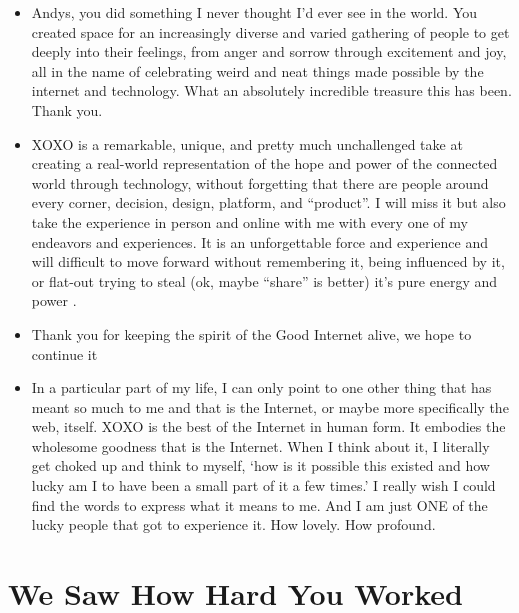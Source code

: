 \documentclass[
]{book}
\providecommand{\tightlist}{%
  \setlength{\itemsep}{0pt}\setlength{\parskip}{0pt}}
\begin{document}
\begin{itemize}
\tightlist
\item
  Andys, you did something I never thought I'd ever see in the world. You created space for an increasingly diverse and varied gathering of people to get deeply into their feelings, from anger and sorrow through excitement and joy, all in the name of celebrating weird and neat things made possible by the internet and technology. What an absolutely incredible treasure this has been. Thank you.
\item
  XOXO is a remarkable, unique, and pretty much unchallenged take at creating a real-world representation of the hope and power of the connected world through technology, without forgetting that there are people around every corner, decision, design, platform, and ``product''. I will miss it but also take the experience in person and online with me with every one of my endeavors and experiences. It is an unforgettable force and experience and will difficult to move forward without remembering it, being influenced by it, or flat-out trying to steal (ok, maybe ``share'' is better) it's pure energy and power .
\item
  Thank you for keeping the spirit of the Good Internet alive, we hope to continue it
\item
  In a particular part of my life, I can only point to one other thing that has meant so much to me and that is the Internet, or maybe more specifically the web, itself. XOXO is the best of the Internet in human form. It embodies the wholesome goodness that is the Internet. When I think about it, I literally get choked up and think to myself, `how is it possible this existed and how lucky am I to have been a small part of it a few times.' I really wish I could find the words to express what it means to me. And I am just ONE of the lucky people that got to experience it. How lovely. How profound.
\end{itemize}

\section{We Saw How Hard You Worked}\label{we-saw-how-hard-you-worked}
\end{document}
